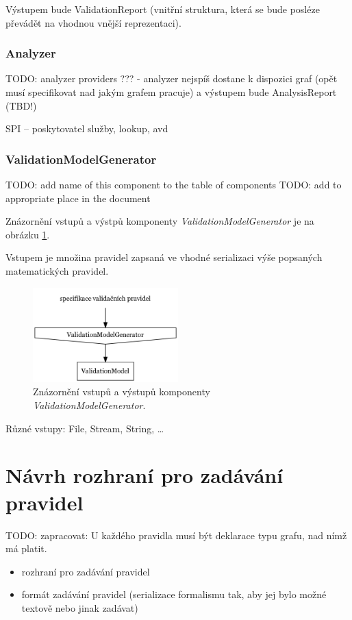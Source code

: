 Výstupem bude ValidationReport (vnitřní struktura, která se bude posléze převádět na vhodnou vnější reprezentaci).

\subsubsection{Analyzer}
TODO: analyzer providers ??? - analyzer nejspíš dostane k dispozici graf (opět musí specifikovat nad jakým grafem pracuje) a výstupem bude AnalysisReport (TBD!)

SPI -- poskytovatel služby, lookup, avd

\subsubsection{ValidationModelGenerator}
TODO: add name of this component to the table of components
TODO: add to appropriate place in the document

Znázornění vstupů a výstpů komponenty \emph{ValidationModelGenerator} je na obrázku \ref{design-validation_model_generator_io}.

Vstupem je množina pravidel zapsaná ve vhodné serializaci výše popsaných matematických pravidel.

\begin{figure}[h!]
  \centering
  \includegraphics[width=0.5\textwidth]{./graphs/validation_model_generator_io_graph.png}
  \caption{Znázornění vstupů a výstupů komponenty \emph{ValidationModelGenerator}.\label{design-validation_model_generator_io}}
\end{figure}

Různé vstupy: File, Stream, String, \ldots

\section{Návrh rozhraní pro zadávání pravidel}
TODO: zapracovat: U každého pravidla musí být deklarace typu grafu, nad nímž má platit.
\begin{itemize}
\item rozhraní pro zadávání pravidel
\item formát zadávání pravidel (serializace formalismu tak, aby jej bylo možné textově nebo jinak zadávat)
\end{itemize}

